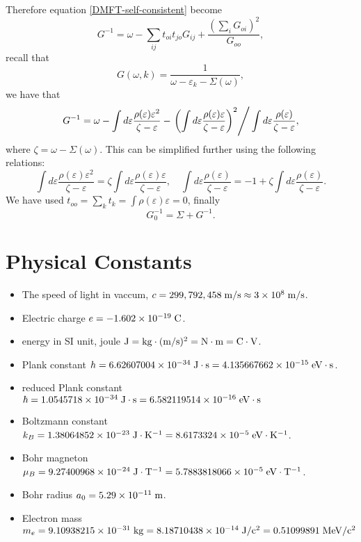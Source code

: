 \documentclass{book}
\numberwithin{equation}{section}
\begin{document}
Therefore equation \eqref{DMFT-self-consistent} become
\begin{equation}
  G^{-1}=\omega-\sum_{ij}t_{oi}t_{jo}G_{ij}+
  \frac{\left(\sum_iG_{oi}\right)^2}{G_{oo}},
\end{equation}
recall that 
\begin{equation}
  G(\omega,k)=\frac{1}{\omega-\varepsilon_k-\Sigma(\omega)},
\end{equation}
we have that
\begin{equation}
  G^{-1}=\omega-\int d\varepsilon
  \frac{\rho(\varepsilon)\varepsilon^2}{\zeta-\varepsilon}
  -\left.\left(\int d\varepsilon
  \frac{\rho(\varepsilon)\varepsilon}{\zeta-\varepsilon}\right)^2\right/
  \int d\varepsilon\frac{\rho(\varepsilon)}{\zeta-\varepsilon},
\end{equation}
where $\zeta=\omega-\Sigma(\omega)$. This can be simplified further
using the following relations:
\begin{equation}
  \int d\varepsilon\frac{\rho(\varepsilon)\varepsilon^2}{\zeta-\varepsilon}
  =\zeta\int d\varepsilon
  \frac{\rho(\varepsilon)\varepsilon}{\zeta-\varepsilon},\quad
  \int d\varepsilon\frac{\rho(\varepsilon)}{\zeta-\varepsilon}=
  -1+\zeta\int d\varepsilon\frac{\rho(\varepsilon)}{\zeta-\varepsilon}.
\end{equation}
We have used $t_{oo}=\sum_kt_k=\int\rho(\varepsilon)\varepsilon=0$, finally
\begin{equation}
  G_0^{-1}=\Sigma+G^{-1}.
\end{equation}
\chapter{Physical Constants}
\begin{itemize}
\item The speed of light in vaccum, $c=299,792,458\;{\rm
  m/s}\approx3\times10^8\;{\rm m/s}$.
\item Electric charge $e=-1.602\times10^{-19}\;{\rm C}$.
\item energy in SI unit, joule $\rm J=kg\cdot(m/s)^2=N\cdot m=C\cdot V$.
\item Plank constant $h=6.62607004\times10^{-34}\;\rm{J\cdot s}=
  4.135667662\times10^{-15}\;{\rm eV\cdot s}$.
\item reduced Plank constant $\hbar=1.0545718\times10^{-34}\;{\rm J\cdot s}
  =6.582119514\times10^{-16}\;{\rm eV\cdot s}$
\item Boltzmann constant $k_B=1.38064852\times10^{-23}\;{\rm J\cdot K^{-1}}
  =8.6173324\times10^{-5}\;{\rm eV\cdot K^{-1}}$.
\item Bohr magneton $\mu_B=9.27400968\times10^{-24}\;{\rm J\cdot T^{-1}}
  =5.7883818066\times10^{-5}\;{\rm eV\cdot T^{-1}}$.
\item Bohr radius $a_0=5.29\times10^{-11}\;\rm m$.
\item Electron mass $m_e=9.10938215\times10^{-31}\;{\rm kg}
  =8.18710438\times10^{-14}\;{\rm J/c^2}=0.51099891\;{\rm MeV/c^2}$
\end{itemize}
\end{document}
